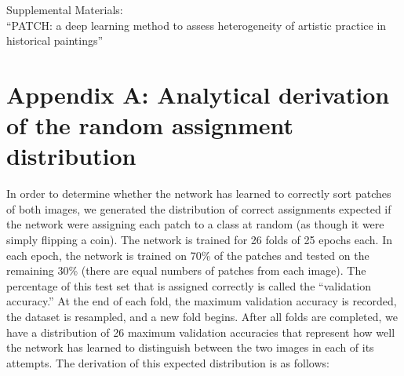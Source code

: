 \documentclass[11pt]{article}
\renewcommand{\figurename}{\fontfamily{phv}\fontsize{9}{12}\selectfont \textbf{Figure}}
\renewcommand{\thetable}{\textbf{\arabic{table}}}
\renewcommand{\thefigure}{\textbf{\arabic{figure}}}
\renewcommand{\tablename}{\fontfamily{phv}\fontsize{9}{12}\selectfont \textbf{Table}}
\begin{document}
\newpage
\setcounter{page}{1}
\setcounter{table}{0}
\setcounter{figure}{0}

\renewcommand{\figurename}{\fontfamily{phv}\fontsize{9}{12}\selectfont Figure}
\renewcommand{\thefigure}{S\arabic{figure}}
\renewcommand{\tablename}{\fontfamily{phv}\fontsize{9}{12}\selectfont Table}
\renewcommand{\thetable}{S\arabic{table}}
\renewcommand{\thepage}{S\arabic{page}}

\begin{center}
\LARGE Supplemental Materials:\\
``PATCH: a deep learning method to assess heterogeneity of artistic practice in historical paintings''
\end{center}

\section*{\selectfont Appendix A: Analytical derivation of the random assignment distribution}

In order to determine whether the network has learned to correctly sort patches of both images, we generated the distribution of correct assignments expected if the network were assigning each patch to a class at random (as though it were simply flipping a coin). The network is trained for 26 folds of 25 epochs each. In each epoch, the network is trained on 70\% of the patches and tested on the remaining 30\% (there are equal numbers of patches from each image). The percentage of this test set that is assigned correctly is called the “validation accuracy.” At the end of each fold, the maximum validation accuracy is recorded, the dataset is resampled, and a new fold begins. After all folds are completed, we have a distribution of 26 maximum validation accuracies that represent how well the network has learned to distinguish between the two images in each of its attempts. The derivation of this expected distribution is as follows:
\end{document}
